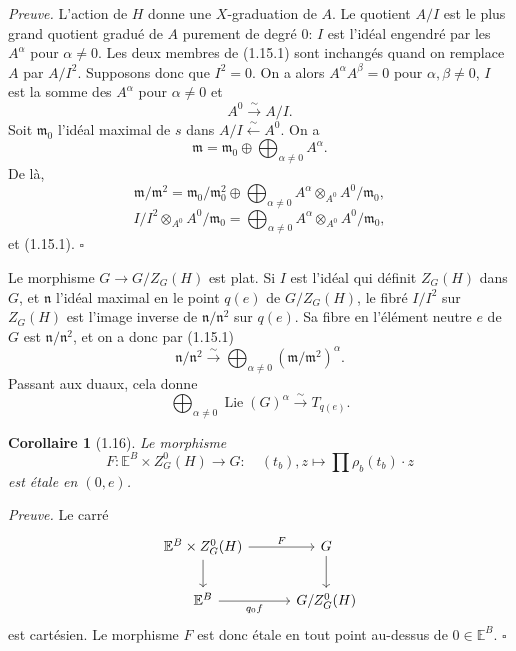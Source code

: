 \documentclass[10pt]{article}
\newcommand{\Lie}{\operatorname{Lie}}
\theoremstyle{deligne}
\newtheorem*{corollary*}{Corollaire}
\newenvironment{proofdel}{\textit{Preuve.}}{\hfill$\square$}
\newcommand{\heading}[1]{\vspace{0.7em}\noindent{\bfseries #1}\quad}
\begin{document}
\begin{proofdel}
L'action de \(H\) donne une \(X\)-graduation de \(A\). Le quotient \(A/I\) est le plus grand quotient gradué de \(A\) purement de degré \(0\): \(I\) est l'idéal engendré par les \(A^\alpha\) pour \(\alpha\ne0\). Les deux membres de (1.15.1) sont inchangés quand on remplace \(A\) par \(A/I^2\). Supposons donc que \(I^2=0\). On a alors \(A^\alpha A^\beta=0\) pour \(\alpha,\beta\ne0\), \(I\) est la somme des \(A^\alpha\) pour \(\alpha\ne0\) et
\[
  A^0\overset{\sim}{\longrightarrow}A/I.
\]
Soit \(\mathfrak m_0\) l'idéal maximal de \(s\) dans \(A/I\overset{\sim}{\leftarrow}A^0\). On a
\[
  \mathfrak m=\mathfrak m_0\oplus\bigoplus_{\alpha\ne0}A^\alpha .
\]
De là,
\[
  \mathfrak m/\mathfrak m^2 =
  \mathfrak m_0/\mathfrak m_0^2\oplus
  \bigoplus_{\alpha\ne0} A^\alpha\otimes_{A^0} A^0/\mathfrak m_0,
\]
\[
  I/I^2\otimes_{A^0}A^0/\mathfrak m_0 =
  \bigoplus_{\alpha\ne0} A^\alpha\otimes_{A^0} A^0/\mathfrak m_0,
\]
et (1.15.1).
\end{proofdel}

\heading{Fin de la preuve de 1.14.} Le morphisme \(G\to G/Z_G(H)\) est plat. Si \(I\) est l'idéal qui définit \(Z_G(H)\) dans \(G\), et \(\mathfrak n\) l'idéal maximal en le point \(q(e)\) de \(G/Z_G(H)\), le fibré \(I/I^2\) sur \(Z_G(H)\) est l'image inverse de \(\mathfrak n/\mathfrak n^2\) sur \(q(e)\). Sa fibre en l'élément neutre \(e\) de \(G\) est \(\mathfrak n/\mathfrak n^2\), et on a donc par (1.15.1)
\[
  \mathfrak n/\mathfrak n^2 \overset{\sim}{\longrightarrow}
  \bigoplus_{\alpha\ne0}(\mathfrak m/\mathfrak m^2)^\alpha .
\]
Passant aux duaux, cela donne
\[
  \bigoplus_{\alpha\ne0}\Lie(G)^\alpha \overset{\sim}{\longrightarrow} T_{q(e)} .
\]

\begin{corollary*}[1.16]
Le morphisme
\[
  F:\mathbb E^B\times Z^0_G(H)\longrightarrow G:\quad
  (t_b),z\longmapsto \prod\rho_b(t_b)\cdot z
\]
est étale en \((0,e)\).
\end{corollary*}

\begin{proofdel}
Le carré
\[
\begin{tikzcd}[column sep=3em,row sep=2em]
\mathbb E^B\times Z^0_G(H) \arrow[r,"F"] \arrow[d] & G \arrow[d]\\
\mathbb E^B \arrow[r,"q_0f"'] & G/Z^0_G(H)
\end{tikzcd}
\]
est cartésien. Le morphisme \(F\) est donc étale en tout point au-dessus de \(0\in\mathbb E^B\).
\end{proofdel}
\end{document}
